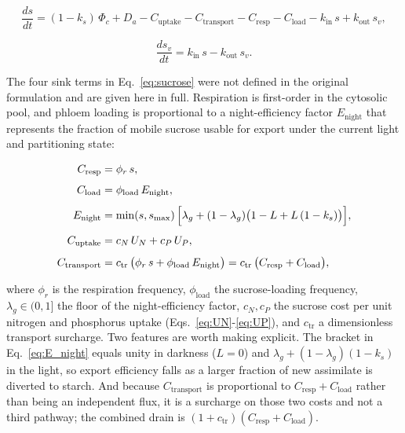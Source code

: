 \documentclass[a4paper,fleqn]{cas-sc}
\begin{document}
\begin{equation}
\frac{ds}{dt} =
(1-k_s)\,\Phi_c + D_a
- C_{\text{uptake}}
- C_{\text{transport}}
- C_{\text{resp}}
- C_{\text{load}}
- k_{\text{in}}\,s + k_{\text{out}}\,s_v,
\label{eq:sucrose}
\end{equation}

\begin{equation}
\frac{ds_v}{dt} =
k_{\text{in}}\,s - k_{\text{out}}\,s_v.
\label{eq:sucrose_vac}
\end{equation}

The four sink terms in Eq.~\eqref{eq:sucrose} were not defined in the
original formulation and are given here in full. Respiration is
first-order in the cytosolic pool, and phloem loading is proportional to a
night-efficiency factor $E_{\text{night}}$ that represents the fraction of
mobile sucrose usable for export under the current light and partitioning
state:

\begin{align}
C_{\text{resp}} &= \phi_r\,s,
\label{eq:C_resp}\\[4pt]
C_{\text{load}} &= \phi_{\text{load}}\,E_{\text{night}},
\label{eq:C_load}\\[4pt]
E_{\text{night}} &=
\min(s,s_{\max})\,
\Bigl[
\lambda_g + (1-\lambda_g)\bigl(1 - L + L\,(1-k_s)\bigr)
\Bigr],
\label{eq:E_night}\\[4pt]
C_{\text{uptake}} &= c_N\,U_N + c_P\,U_P,
\label{eq:C_uptake}\\[4pt]
C_{\text{transport}} &=
c_{\text{tr}}\,\bigl(\phi_r\,s + \phi_{\text{load}}\,E_{\text{night}}\bigr)
= c_{\text{tr}}\,\bigl(C_{\text{resp}} + C_{\text{load}}\bigr),
\label{eq:C_transport}
\end{align}

where $\phi_r$ is the respiration frequency, $\phi_{\text{load}}$ the
sucrose-loading frequency, $\lambda_g \in (0,1]$ the floor of the
night-efficiency factor, $c_N,c_P$ the sucrose cost per unit nitrogen and
phosphorus uptake (Eqs.~\eqref{eq:UN}-\eqref{eq:UP}), and
$c_{\text{tr}}$ a dimensionless transport surcharge. Two features are
worth making explicit. The bracket in Eq.~\eqref{eq:E_night} equals unity
in darkness ($L=0$) and $\lambda_g + (1-\lambda_g)(1-k_s)$ in the light, so
export efficiency falls as a larger fraction of new assimilate is diverted
to starch. And because $C_{\text{transport}}$ is proportional to
$C_{\text{resp}}+C_{\text{load}}$ rather than being an independent flux, it
is a surcharge on those two costs and not a third pathway; the combined
drain is $(1+c_{\text{tr}})(C_{\text{resp}}+C_{\text{load}})$.
\end{document}
